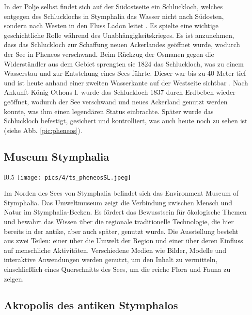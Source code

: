\documentclass[preprint]{geomorphica} %
\begin{document}
In der Polje selbst findet sich auf der Südostseite ein Schluckloch, welches entgegen des Schlucklochs in Stymphalia das Wasser nicht nach Südosten, sondern nach Westen in den Fluss Ladon leitet \cite{unkelHydraHermesHerkules2020}. Es spielte eine wichtige geschichtliche Rolle während des Unabhängigkeitskrieges. Es ist anzunehmen, dass das Schluckloch zur Schaffung neuen Ackerlandes geöffnet wurde, wodurch der See in Pheneos verschwand. Beim Rückzug der Osmanen gegen die Widerständler aus dem Gebiet sprengten sie 1824 das Schluckloch, was zu einem Wasserstau und zur Entstehung eines Sees führte. Dieser war bis zu 40 Meter tief und ist heute anhand einer zweiten Wasserkante auf der Westseite sichtbar \cite{seguinReconstructionPalaeoenvironmentalVariability2020}. Nach Ankunft König Othons I. wurde das Schluckloch 1837 durch Erdbeben wieder geöffnet, wodurch der See verschwand und neues Ackerland genutzt werden konnte, was ihm einen legendären Status einbrachte. Später wurde das Schluckloch befestigt, gesichert und kontrolliert, was auch heute noch zu sehen ist (siehe Abb. \ref{pic:pheneos}).

\subsection{Museum Stymphalia}
\label{sec:museum}

\begin{wrapfigure}{l}{0.5\textwidth}
    \centering
    \texttt{[image: pics/4/ts\_pheneosSL.jpeg]}
    \caption{Ingmar und ich auf Erkundungstour: bebautes und befestigtes östliches Pheneos-Schluckloch [Foto: Tabea Storch].}
    \label{pic:pheneos}
\end{wrapfigure}

Im Norden des Sees von Stymphalia befindet sich das Environment Museum of Stymphalia. Das Umweltmuseum zeigt die Verbindung zwischen Mensch und Natur im Stymphalia-Becken. Es fördert das Bewusstsein für ökologische Themen und bewahrt das Wissen über die regionale traditionelle Technologie, die hier bereits in der antike, aber auch später, genutzt wurde. Die Ausstellung besteht aus zwei Teilen: einer über die Umwelt der Region und einer über deren Einfluss auf menschliche Aktivitäten. Verschiedene Medien wie Bilder, Modelle und interaktive Anwendungen werden genutzt, um den Inhalt zu vermitteln, einschließlich eines Querschnitts des Sees, um die reiche Flora und Fauna zu zeigen.

\subsection{Akropolis des antiken Stymphalos}
\end{document}

